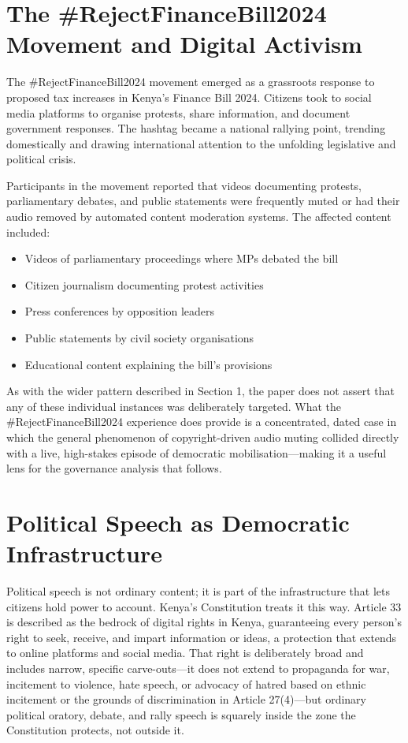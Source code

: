 \documentclass{article}
\begin{document}
\section{The \#RejectFinanceBill2024 Movement and Digital Activism}

The \#RejectFinanceBill2024 movement emerged as a grassroots response to proposed tax increases in Kenya's Finance Bill 2024. Citizens took to social media platforms to organise protests, share information, and document government responses. The hashtag became a national rallying point, trending domestically and drawing international attention to the unfolding legislative and political crisis.

Participants in the movement reported that videos documenting protests, parliamentary debates, and public statements were frequently muted or had their audio removed by automated content moderation systems. The affected content included:
\begin{itemize}
\item Videos of parliamentary proceedings where MPs debated the bill
\item Citizen journalism documenting protest activities
\item Press conferences by opposition leaders
\item Public statements by civil society organisations
\item Educational content explaining the bill's provisions
\end{itemize}

As with the wider pattern described in Section 1, the paper does not assert that any of these individual instances was deliberately targeted. What the \#RejectFinanceBill2024 experience does provide is a concentrated, dated case in which the general phenomenon of copyright-driven audio muting collided directly with a live, high-stakes episode of democratic mobilisation—making it a useful lens for the governance analysis that follows.

\section{Political Speech as Democratic Infrastructure}

Political speech is not ordinary content; it is part of the infrastructure that lets citizens hold power to account. Kenya's Constitution treats it this way. Article 33 is described as the bedrock of digital rights in Kenya, guaranteeing every person's right to seek, receive, and impart information or ideas, a protection that extends to online platforms and social media.\cite{bake2025} That right is deliberately broad and includes narrow, specific carve-outs—it does not extend to propaganda for war, incitement to violence, hate speech, or advocacy of hatred based on ethnic incitement or the grounds of discrimination in Article 27(4)\cite{constitution2010}—but ordinary political oratory, debate, and rally speech is squarely inside the zone the Constitution protects, not outside it.
\end{document}
